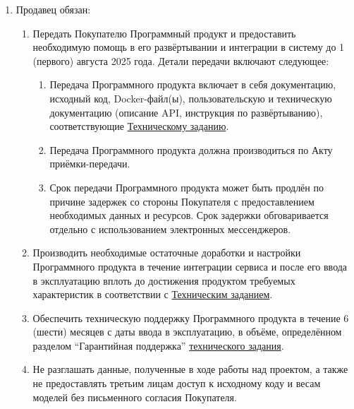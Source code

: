 \documentclass[12pt]{article}
\newcommand{\TZ}[1][Техническое задание]{\hyperref[link-tz]{#1}}
\begin{document}
\begin{enumerate}
    \item Продавец обязан:
          \begin{enumerate}
              \item Передать Покупателю Программный продукт и предоставить необходимую помощь в его развёртывании и интеграции в систему до 1 (первого) августа 2025 года. Детали передачи включают следующее:
                    \begin{enumerate}
                        \item Передача Программного продукта включает в себя  документацию, исходный код, Docker-файл(ы), пользовательскую и техническую документацию (описание API, инструкция по развёртыванию), соответствующие \TZ[Техническому заданию].
                        \item Передача Программного продукта должна производиться по Акту приёмки-передачи.
                        \item Срок передачи Программного продукта может быть продлён по причине задержек со стороны Покупателя с предоставлением необходимых данных и ресурсов. Срок задержки обговаривается отдельно с использованием электронных мессенджеров.
                    \end{enumerate}
              \item Производить необходимые остаточные доработки и настройки Программного продукта в течение интеграции сервиса и после его ввода в эксплуатацию вплоть до достижения продуктом требуемых характеристик в соответствии с \TZ[Техническим заданием].
              \item Обеспечить техническую поддержку Программного продукта в течение 6 (шести) месяцев с даты ввода в эксплуатацию, в объёме, определённом разделом ``Гарантийная поддержка'' \TZ[технического задания].
              \item Не разглашать данные, полученные в ходе работы над проектом, а также не предоставлять третьим лицам доступ к исходному коду и весам моделей без письменного согласия Покупателя.
          \end{enumerate}


\end{enumerate}
\end{document}

